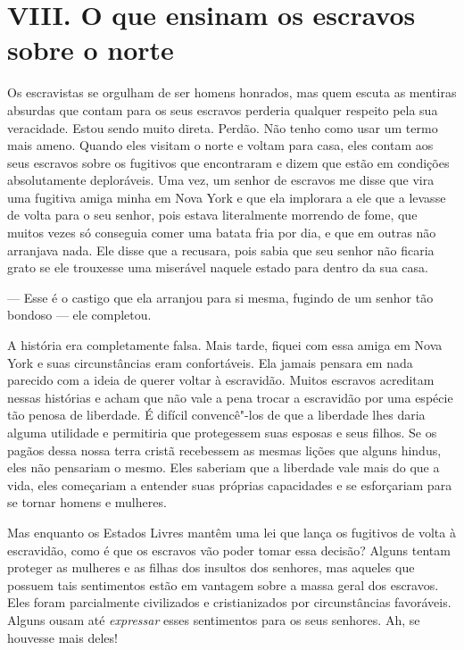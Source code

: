\chapter{VIII. O que ensinam os escravos sobre o
norte}


Os escravistas se orgulham de ser
homens honrados, mas quem escuta as mentiras absurdas que contam para os
seus escravos perderia qualquer respeito pela sua veracidade. Estou
sendo muito direta. Perdão. Não tenho como usar um termo mais ameno.
Quando eles visitam o norte e voltam para casa, eles contam aos seus
escravos sobre os fugitivos que encontraram e dizem que estão em
condições absolutamente deploráveis. Uma vez, um senhor de escravos me
disse que vira uma fugitiva amiga minha em Nova York e que ela implorara
a ele que a levasse de volta para o seu senhor, pois estava literalmente
morrendo de fome, que muitos vezes só conseguia comer uma batata fria
por dia, e que em outras não arranjava nada. Ele disse que a recusara,
pois sabia que seu senhor não ficaria grato se ele trouxesse uma
miserável naquele estado para dentro da sua casa.

--- Esse é o castigo que ela arranjou para si mesma, fugindo de um
senhor tão bondoso --- ele completou.

A história era completamente falsa.
Mais tarde, fiquei com essa amiga em Nova York e suas circunstâncias
eram confortáveis. Ela jamais pensara em nada parecido com a ideia de
querer voltar à escravidão. Muitos escravos acreditam nessas histórias e
acham que não vale a pena trocar a escravidão por uma espécie tão penosa
de liberdade. É difícil convencê"-los de que a liberdade lhes daria
alguma utilidade e permitiria que protegessem suas esposas e seus
filhos. Se os pagãos dessa nossa terra cristã recebessem as mesmas
lições que alguns hindus, eles não pensariam o mesmo. Eles saberiam que
a liberdade vale mais do que a vida, eles começariam a entender suas
próprias capacidades e se esforçariam para se tornar homens e mulheres.

Mas enquanto os Estados Livres mantêm
uma lei que lança os fugitivos de volta à escravidão, como é que os
escravos vão poder tomar essa decisão? Alguns tentam proteger as
mulheres e as filhas dos insultos dos senhores, mas aqueles que possuem
tais sentimentos estão em vantagem sobre a massa geral dos escravos.
Eles foram parcialmente civilizados e cristianizados por circunstâncias
favoráveis. Alguns ousam até \emph{expressar} esses sentimentos para os
seus senhores. Ah, se houvesse mais deles!

